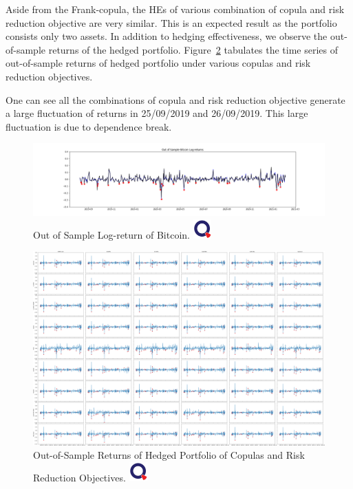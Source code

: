 Aside from the Frank-copula, the HEs of various combination of copula and risk reduction objective are very similar.
This is an expected result as the portfolio consists only two assets.
In addition to hedging effectiveness, we observe the out-of-sample returns of the hedged portfolio.
Figure~\ref{fig:OOSRH} tabulates the time series of out-of-sample returns of hedged portfolio under various copulas and risk reduction objectives.

One can see all the combinations of copula and risk reduction objective generate a large fluctuation of returns in
25/09/2019 and 26/09/2019.
This large fluctuation is due to dependence break.
\medskip

\begin{figure}[th]
   \centering
   \includegraphics[width=\textwidth]{_pics/OOSBitcoin.png}
   \caption{Out of Sample Log-return of Bitcoin.
   \href{http://www.quantlet.com/}{\includegraphics[width=20pt]{_pics/qletlogo_tr.png}}}
   \label{fig:Gumbel}
\end{figure}

\newpage
\begin{landscape}
\begin{figure}[th]
   \centering
   \includegraphics[width=\linewidth]{_pics/Rhs.png}
   \caption{Out-of-Sample Returns of Hedged Portfolio of Copulas and Risk Reduction Objectives.
   \href{http://www.quantlet.com/}{\includegraphics[width=20pt]{_pics/qletlogo_tr.png}}}
   \label{fig:OOSRH}
\end{figure}
\end{landscape}
\newpage

